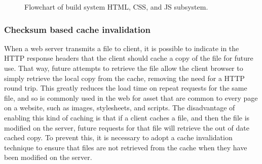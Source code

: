 \begin{figure}[H]
\caption[Flowchart of build system HTML, CSS, and JS subsystem]
        {Flowchart of build system HTML, CSS, and JS subsystem.}
\label{fig:build-system-flowchart}
\end{figure}


\subsubsection*{Checksum based cache invalidation}

When a web server transmits a file to client, it is possible to
indicate in the HTTP response headers that the client should cache a
copy of the file for future use. That way, future attempts to retrieve
the file allow the client browser to simply retrieve the local copy
from the cache, removing the need for a HTTP round trip. This greatly
reduces the load time on repeat requests for the same file, and so is
commonly used in the web for asset that are common to every page on a
website, such as images, stylesheets, and scripts. The disadvantage of
enabling this kind of caching is that if a client caches a file, and
then the file is modified on the server, future requests for that file
will retrieve the out of date cached copy. To prevent this, it is
necessary to adopt a cache invalidation technique to ensure that files
are not retrieved from the cache when they have been modified on the
server.

